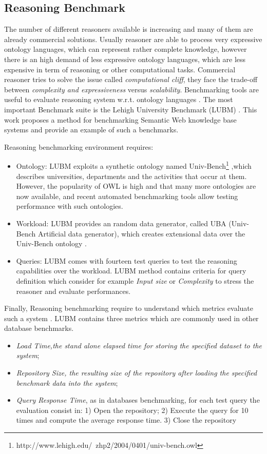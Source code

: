 \subsection{Reasoning Benchmark}\label{sec:lubm}

The number of different reasoners available is increasing and many of them are already commercial solutions. Usually reasoner are able to process very expressive ontology languages, which can represent rather complete knowledge, however there is an high demand of  less expressive ontology languages, which are less expensive in term of reasoning or other computational tasks. Commercial reasoner tries to solve the issue called \textit{computational cliff}, they face the trade-off between \textit{complexity and expressiveness} versus \textit{scalability}. Benchmarking tools are useful to evaluate reasoning system w.r.t. ontology languages 
\cite{bock2008benchmarking}. The most important Benchmark suite is the Lehigh University Benchmark  (LUBM) \cite{Guo2005}. This work proposes a  method for benchmarking Semantic Web knowledge base systems and provide an example of such a benchmarks.

Reasoning benchmarking environment requires:
\begin{itemize}
\item Ontology: LUBM exploits a synthetic ontology named Univ-Bench\footnote{http://www.lehigh.edu/~zhp2/2004/0401/univ-bench.owl} ,which describes universities, departments and the activities that occur at them. However, the popularity of OWL is high and that
many more ontologies are now available, and recent automated benchmarking tools allow testing performance with such ontologies\cite{gardiner2006automated}.

\item Workload: LUBM provides an random data generator, called UBA (Univ-Bench Artificial data generator), which creates extensional data over the Univ-Bench ontology \cite{Guo2005}.

\item Queries: LUBM comes with fourteen test queries to test the reasoning capabilities over the workload. LUBM method contains criteria for query definition which consider for example \textit{Input size} or \textit{Complexity} to stress the reasoner and evaluate performances.
\end{itemize}

Finally, Reasoning benchmarking require to understand which metrics evaluate such a system \cite{Guo2005}. LUBM contains three metrics which are commonly used in other database benchmarks.\begin{itemize}
\item \textit{Load Time,the stand alone elapsed time for storing the specified dataset to the system};
\item \textit{Repository Size, the resulting size of the repository after loading the specified benchmark data into the system};
\item \textit{Query Response Time}, as in databases benchmarking, for each test query the evaluation consist in:
  	1) Open the repository; 2) Execute the query for 10 times and compute the average response time. 3) Close the repository
\end{itemize}

